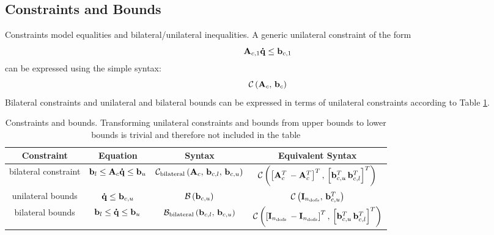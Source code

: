 \subsection{Constraints and Bounds}
Constraints model equalities and bilateral/unilateral inequalities. 
A generic unilateral constraint of the form
\begin{equation}
\mathbf{A}_{c,1}\mathbf{\dot{q}} \leq \mathbf{b}_{c,1} 
\end{equation}
can be expressed using the simple syntax: 
\begin{equation}
\mathcal{C}\left( \mathbf{A}_c,\, \mathbf{b}_c \right)
\end{equation}
Bilateral constraints and unilateral and bilateral bounds can be expressed in terms of unilateral constraints according to Table \ref{table:constraints_and_bounds}.

\begin{table}[hbt]
   \begin{center}
   \begin{tabular}{| c | c | c | c |}
   \hline
   Constraint & Equation & Syntax & Equivalent Syntax \\\hline
   \cline{1-4}
   bilateral constraint & $\mathbf{b}_{l} \leq \mathbf{A}_{c}\mathbf{\dot{q}} \leq \mathbf{b}_{u}$ & $\mathcal{C}_\text{bilateral}\left( \mathbf{A}_c, \, \mathbf{b}_{c,l}, \, \mathbf{b}_{c,u} \right)$ & $\mathcal{C} \left( \left[ \mathbf{A}_{c}^T \, -\mathbf{A}_{c}^T \right]^T, \, \left[ \mathbf{b}_{c,u}^T \, \mathbf{b}_{c,l}^T \right]^T \right)$ \\\hline
   unilateral bounds     & $\mathbf{\dot{q}} \leq \mathbf{b}_{c,u}$       & $\mathcal{B}\left( \mathbf{b}_{c,u} \right)$ & $\mathcal{C}\left(\mathbf{I}_{n_\text{dofs}}, \, \mathbf{b}_{c,u}^T \right)$ \\\hline
   bilateral bounds     & $\mathbf{b}_{l} \leq \mathbf{\dot{q}} \leq \mathbf{b}_{u}$       & $\mathcal{B}_\text{bilateral}\left( \mathbf{b}_{c,l}, \, \mathbf{b}_{c,u} \right)$ & $\mathcal{C}\left(\left[ \mathbf{I}_{n_\text{dofs}}  \, -\mathbf{I}_{n_\text{dofs}} \right]^T, \, \left[ \mathbf{b}_{c,u}^T \, \mathbf{b}_{c,l}^T \right]^T \right)$ \\\hline
   \end{tabular}
   \end{center}
   \caption{Constraints and bounds. Transforming unilateral constraints and bounds from upper bounds to lower bounds is trivial and therefore not included in the table}
   \label{table:constraints_and_bounds}
\end{table}

